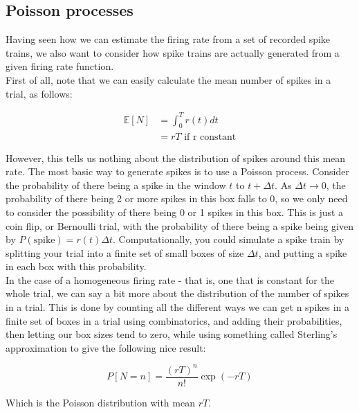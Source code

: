 \documentclass{article}
\begin{document}
\subsection{Poisson processes}

Having seen how we can estimate the firing rate from a set of recorded spike trains, we also want to consider how spike trains are actually generated from a given firing rate function.\\

First of all, note that we can easily calculate the mean number of spikes in a trial, as follows:

\begin{align*}
	\mathbb{E} [N] & = \int_0^T r(t)dt          \\
	               & = rT \text{ if r constant}
\end{align*}

However, this tells us nothing about the distribution of spikes around this mean rate. The most basic way to generate spikes is to use a Poisson process. Consider the probability of there being a spike in the window $t$ to $t+\Delta t$. As $\Delta t \to 0$, the probability of there being 2 or more spikes in this box falls to 0, so we only need to consider the possibility of there being 0 or 1 spikes in this box. This is just a coin flip, or Bernoulli trial, with the probability of there being a spike being given by $P(\text{spike})=r(t)\Delta t$. Computationally, you could simulate a spike train by splitting your trial into a finite set of small boxes of size $\Delta t$, and putting a spike in each box with this probability.\\

In the case of a homogeneous firing rate - that is, one that is constant for the whole trial, we can say a bit more about the distribution of the number of spikes in a trial. This is done by counting all the different ways we can get n spikes in a finite set of boxes in a trial using combinatorics, and adding their probabilities, then letting our box sizes tend to zero, while using something called Sterling's approximation to give the following nice result:

\begin{equation*}
	P[N=n] = \frac{(rT)^n}{n!} \exp(-rT)
\end{equation*}

Which is the Poisson distribution with mean $rT$.\\
\end{document}
